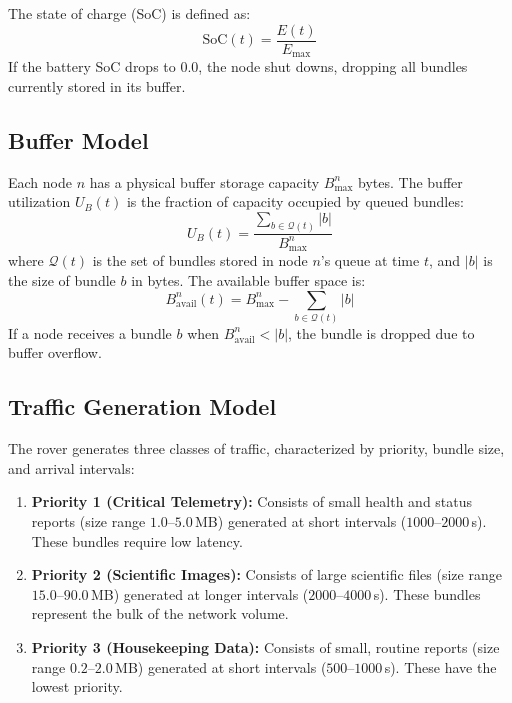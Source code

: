 \documentclass[journal,twocolumn]{IEEEtran}
\begin{document}
The state of charge (SoC) is defined as:
\begin{equation}
    \text{SoC}(t) = \frac{E(t)}{E_{\max}}
\end{equation}
If the battery SoC drops to $0.0$, the node shut downs, dropping all bundles currently stored in its buffer.

\subsection{Buffer Model}
Each node $n$ has a physical buffer storage capacity $B_{\max}^n$ bytes. The buffer utilization $U_B(t)$ is the fraction of capacity occupied by queued bundles:
\begin{equation}
    U_B(t) = \frac{\sum_{b \in \mathcal{Q}(t)} |b|}{B_{\max}^n}
\end{equation}
where $\mathcal{Q}(t)$ is the set of bundles stored in node $n$'s queue at time $t$, and $|b|$ is the size of bundle $b$ in bytes. The available buffer space is:
\begin{equation}
    B_{\text{avail}}^n(t) = B_{\max}^n - \sum_{b \in \mathcal{Q}(t)} |b|
\end{equation}
If a node receives a bundle $b$ when $B_{\text{avail}}^n < |b|$, the bundle is dropped due to buffer overflow.

\subsection{Traffic Generation Model}
The rover generates three classes of traffic, characterized by priority, bundle size, and arrival intervals:
\begin{enumerate}
    \item \textbf{Priority 1 (Critical Telemetry):} Consists of small health and status reports (size range $1.0$--$5.0\,$MB) generated at short intervals ($1000$--$2000\,$s). These bundles require low latency.
    \item \textbf{Priority 2 (Scientific Images):} Consists of large scientific files (size range $15.0$--$90.0\,$MB) generated at longer intervals ($2000$--$4000\,$s). These bundles represent the bulk of the network volume.
    \item \textbf{Priority 3 (Housekeeping Data):} Consists of small, routine reports (size range $0.2$--$2.0\,$MB) generated at short intervals ($500$--$1000\,$s). These have the lowest priority.
\end{enumerate}

\end{document}
